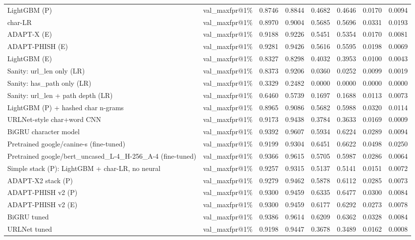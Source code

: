 \begin{table}[t]
\begin{tabular}{llrrrrrr}
LightGBM (P) & val\_maxfpr@1\% & 0.8746 & 0.8844 & 0.4682 & 0.4646 & 0.0170 & 0.0094 \\
char-LR & val\_maxfpr@1\% & 0.8970 & 0.9004 & 0.5685 & 0.5696 & 0.0331 & 0.0193 \\
ADAPT-X (E) & val\_maxfpr@1\% & 0.9188 & 0.9226 & 0.5451 & 0.5354 & 0.0170 & 0.0081 \\
ADAPT-PHISH (E) & val\_maxfpr@1\% & 0.9281 & 0.9426 & 0.5616 & 0.5595 & 0.0198 & 0.0069 \\
LightGBM (E) & val\_maxfpr@1\% & 0.8327 & 0.8298 & 0.4032 & 0.3953 & 0.0100 & 0.0043 \\
Sanity: url\_len only (LR) & val\_maxfpr@1\% & 0.8373 & 0.9206 & 0.0360 & 0.0252 & 0.0099 & 0.0019 \\
Sanity: has\_path only (LR) & val\_maxfpr@1\% & 0.3329 & 0.2482 & 0.0000 & 0.0000 & 0.0000 & 0.0000 \\
Sanity: url\_len + path depth (LR) & val\_maxfpr@1\% & 0.6460 & 0.5739 & 0.1697 & 0.1688 & 0.0113 & 0.0073 \\
LightGBM (P) + hashed char n-grams & val\_maxfpr@1\% & 0.8965 & 0.9086 & 0.5682 & 0.5988 & 0.0320 & 0.0114 \\
URLNet-style char+word CNN & val\_maxfpr@1\% & 0.9173 & 0.9438 & 0.3784 & 0.3633 & 0.0169 & 0.0009 \\
BiGRU character model & val\_maxfpr@1\% & 0.9392 & 0.9607 & 0.5934 & 0.6224 & 0.0289 & 0.0094 \\
Pretrained google/canine-s (fine-tuned) & val\_maxfpr@1\% & 0.9199 & 0.9304 & 0.6451 & 0.6622 & 0.0498 & 0.0250 \\
Pretrained google/bert\_uncased\_L-4\_H-256\_A-4 (fine-tuned) & val\_maxfpr@1\% & 0.9366 & 0.9615 & 0.5705 & 0.5987 & 0.0286 & 0.0064 \\
Simple stack (P): LightGBM + char-LR, no neural & val\_maxfpr@1\% & 0.9257 & 0.9315 & 0.5137 & 0.5141 & 0.0151 & 0.0072 \\
ADAPT-X2 stack (P) & val\_maxfpr@1\% & 0.9279 & 0.9462 & 0.5878 & 0.6112 & 0.0285 & 0.0073 \\
ADAPT-PHISH v2 (P) & val\_maxfpr@1\% & 0.9300 & 0.9459 & 0.6335 & 0.6477 & 0.0300 & 0.0084 \\
ADAPT-PHISH v2 (E) & val\_maxfpr@1\% & 0.9300 & 0.9459 & 0.6177 & 0.6292 & 0.0273 & 0.0078 \\
BiGRU tuned & val\_maxfpr@1\% & 0.9386 & 0.9614 & 0.6209 & 0.6362 & 0.0328 & 0.0084 \\
URLNet tuned & val\_maxfpr@1\% & 0.9198 & 0.9447 & 0.3678 & 0.3489 & 0.0162 & 0.0008 \\

\end{tabular}
\end{table}
